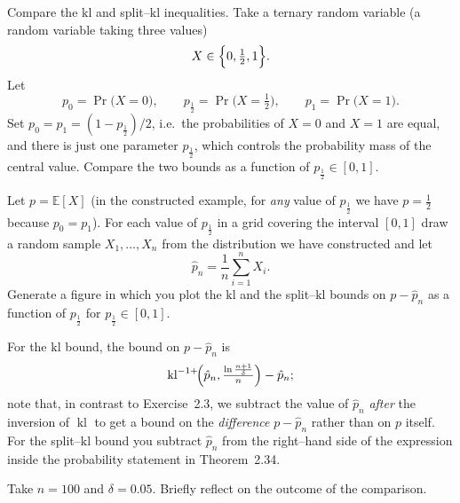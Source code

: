 \documentclass[12pt]{article}
\begin{document}
\begin{exercise}\label{ex:2.6}
Compare the $\mathrm{kl}$ and split–$\mathrm{kl}$ inequalities.  
Take a ternary random variable (a random variable taking three values)
\[
  X \in \Bigl\{0,\tfrac12,1\Bigr\}.
\]
Let
\[
  p_{0}= \Pr\!\bigl(X=0\bigr), \qquad
  p_{\frac12}= \Pr\!\bigl(X=\tfrac12\bigr), \qquad
  p_{1}= \Pr\!\bigl(X=1\bigr).
\]
Set \(p_{0}=p_{1}=(1-p_{\frac12})/2\), i.e.\ the probabilities of
\(X=0\) and \(X=1\) are equal, and there is just one parameter
\(p_{\frac12}\), which controls the probability mass of the central
value.  Compare the two bounds as a function of
\(p_{\frac12}\in[0,1]\).

Let \(p=\mathbb{E}[X]\) (in the constructed example, for \emph{any}
value of \(p_{\frac12}\) we have \(p=\tfrac12\) because
\(p_{0}=p_{1}\)).  
For each value of \(p_{\frac12}\) in a grid covering the
interval \([0,1]\) draw a random sample
\(X_{1},\dots ,X_{n}\) from the distribution we have constructed and
let
\[
  \hat p_{n}= \frac1n \sum_{i=1}^{n} X_{i}.
\]
Generate a figure in which you plot the $\mathrm{kl}$ and the
split–$\mathrm{kl}$ bounds on \(p-\hat p_{n}\) as a function of
\(p_{\frac12}\) for \(p_{\frac12}\in[0,1]\).

For the $\mathrm{kl}$ bound, the bound on \(p-\hat p_{n}\) is  
\[
  \operatorname{kl}^{-1+}\!\Bigl(\hat p_{n},
        \tfrac{\ln\frac{n+1}{\delta}}{n}
  \Bigr)
  -\hat p_{n};
\]
note that, in contrast to Exercise~2.3, we subtract the value of
\(\hat p_{n}\) \emph{after} the inversion of $\operatorname{kl}$ to get
a bound on the \emph{difference} \(p-\hat p_{n}\) rather than on
\(p\) itself.  
For the split–$\mathrm{kl}$ bound you subtract \(\hat p_{n}\) from the
right–hand side of the expression inside the probability statement in
Theorem~2.34.

Take \(n=100\) and \(\delta=0.05\).  
Briefly reflect on the outcome of the comparison.
\end{exercise}
\end{document}
